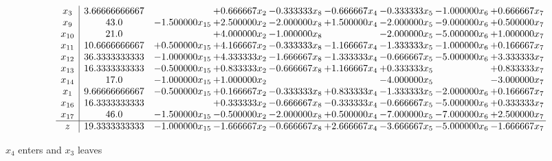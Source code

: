 \documentclass[10pt]{article}
\begin{document}
 \[\begin{array}{c| c c@{\hskip 2pt} c@{\hskip 2pt} c@{\hskip 2pt} c@{\hskip 2pt} c@{\hskip 2pt} c@{\hskip 2pt} c@{\hskip 2pt} }
 x_{3}   &  3.66666666667  &   & + 0.666667 x_{2} & -0.333333 x_{8} & -0.666667 x_{4} & -0.333333 x_{5} & -1.000000 x_{6} & + 0.666667 x_{7}\\
 x_{9}   &  43.0 & -1.500000 x_{15} & + 2.500000 x_{2} & -2.000000 x_{8} & + 1.500000 x_{4} & -2.000000 x_{5} & -9.000000 x_{6} & + 0.500000 x_{7}\\
 x_{10}   &  21.0  &   & + 4.000000 x_{2} & -1.000000 x_{8} &   & -2.000000 x_{5} & -5.000000 x_{6} & + 1.000000 x_{7}\\
 x_{11}   &  10.6666666667 & + 0.500000 x_{15} & + 4.166667 x_{2} & -0.333333 x_{8} & -1.166667 x_{4} & -1.333333 x_{5} & -1.000000 x_{6} & + 0.166667 x_{7}\\
 x_{12}   &  36.3333333333 & -1.000000 x_{15} & + 4.333333 x_{2} & -1.666667 x_{8} & -1.333333 x_{4} & -0.666667 x_{5} & -5.000000 x_{6} & + 3.333333 x_{7}\\
 x_{13}   &  16.3333333333 & -0.500000 x_{15} & + 0.833333 x_{2} & -0.666667 x_{8} & + 1.166667 x_{4} & + 0.333333 x_{5} &   & + 0.833333 x_{7}\\
 x_{14}   &  17.0 & -1.000000 x_{15} & + 1.000000 x_{2} &    &   & -4.000000 x_{5} &   & -3.000000 x_{7}\\
 x_{1}   &  9.66666666667 & -0.500000 x_{15} & + 0.166667 x_{2} & -0.333333 x_{8} & + 0.833333 x_{4} & -1.333333 x_{5} & -2.000000 x_{6} & + 0.166667 x_{7}\\
 x_{16}   &  16.3333333333  &   & + 0.333333 x_{2} & -0.666667 x_{8} & -0.333333 x_{4} & -0.666667 x_{5} & -5.000000 x_{6} & + 0.333333 x_{7}\\
 x_{17}   &  46.0 & -1.500000 x_{15} & -0.500000 x_{2} & -2.000000 x_{8} & + 0.500000 x_{4} & -7.000000 x_{5} & -7.000000 x_{6} & + 2.500000 x_{7}\\
\hline
z    &  19.3333333333 & -1.000000 x_{15} & -1.666667 x_{2} & -0.666667 x_{8} & + 2.666667 x_{4} & -3.666667 x_{5} & -5.000000 x_{6} & -1.666667 x_{7}\\
\end{array}\]


 $ x_{4} $ enters and $ x_{3} $ leaves 
\end{document}
